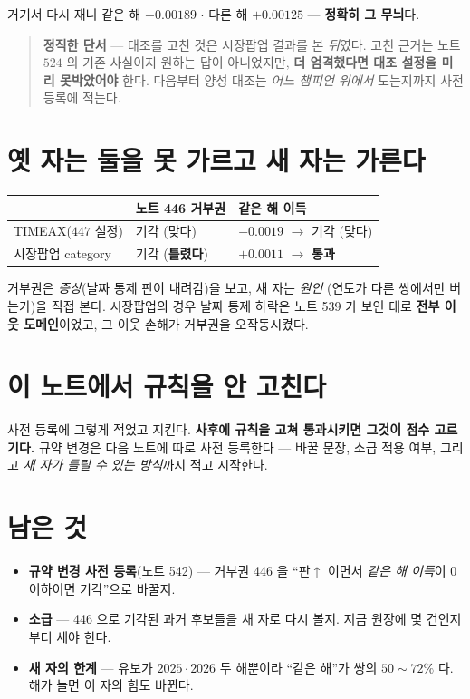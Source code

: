 \documentclass[11pt]{article}
\begin{document}
거기서 다시 재니 같은 해 $\mathbf{-0.00189}$ $\cdot$ 다른 해
$\mathbf{+0.00125}$ --- \textbf{정확히 그 무늬}다.

\begin{quote}
\textbf{정직한 단서} --- 대조를 고친 것은 시장팝업 결과를 본 \emph{뒤}였다.
고친 근거는 노트 $524$ 의 기존 사실이지 원하는 답이 아니었지만,
\textbf{더 엄격했다면 대조 설정을 미리 못박았어야} 한다. 다음부터 양성
대조는 \emph{어느 챔피언 위에서} 도는지까지 사전 등록에 적는다.
\end{quote}

\section{옛 자는 둘을 못 가르고 새 자는 가른다}

\begin{center}
\begin{tabular}{lll}
\hline
 & 노트 446 거부권 & \textbf{같은 해 이득} \\
\hline
TIMEAX($447$ 설정) & 기각 (맞다) & $-0.0019$ $\to$ 기각 (맞다) \\
시장팝업 category & 기각 (\textbf{틀렸다}) & $\mathbf{+0.0011}$ $\to$ \textbf{통과} \\
\hline
\end{tabular}
\end{center}

거부권은 \emph{증상}(날짜 통제 판이 내려감)을 보고, 새 자는 \emph{원인}
(연도가 다른 쌍에서만 버는가)을 직접 본다. 시장팝업의 경우 날짜 통제 하락은
노트 539 가 보인 대로 \textbf{전부 이웃 도메인}이었고, 그 이웃 손해가
거부권을 오작동시켰다.

\section*{이 노트에서 규칙을 안 고친다}

사전 등록에 그렇게 적었고 지킨다. \textbf{사후에 규칙을 고쳐 통과시키면
그것이 점수 고르기다.} 규약 변경은 다음 노트에 따로 사전 등록한다 ---
바꿀 문장, 소급 적용 여부, 그리고 \emph{새 자가 틀릴 수 있는 방식}까지 적고
시작한다.

\section*{남은 것}

\begin{itemize}
\item \textbf{규약 변경 사전 등록}(노트 542) --- 거부권 446 을 ``판$\uparrow$
이면서 \emph{같은 해 이득}이 $0$ 이하이면 기각''으로 바꿀지.
\item \textbf{소급} --- 446 으로 기각된 과거 후보들을 새 자로 다시 볼지.
지금 원장에 몇 건인지부터 세야 한다.
\item \textbf{새 자의 한계} --- 유보가 $2025 \cdot 2026$ 두 해뿐이라 ``같은 해''가
쌍의 $50\!\sim\!72\%$ 다. 해가 늘면 이 자의 힘도 바뀐다.
\end{itemize}
\end{document}
